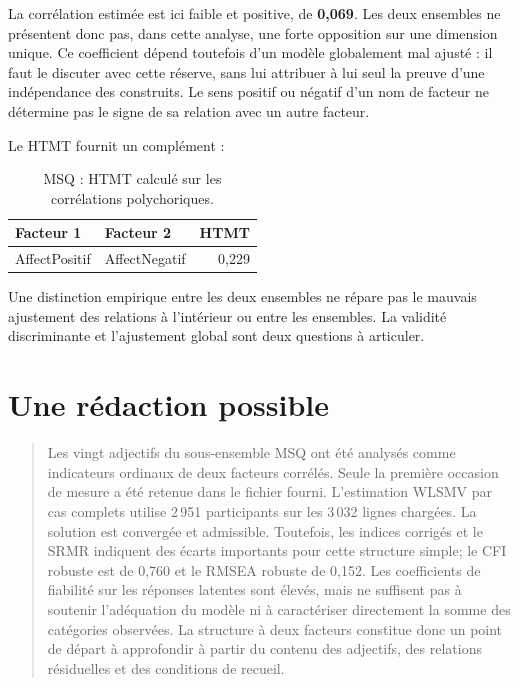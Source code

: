 \documentclass[
  french,
  11pt,
  a4paper,
  DIV=11,
  numbers=noendperiod]{scrreprt}
\begin{document}
La corrélation estimée est ici faible et positive, de \textbf{0,069}.
Les deux ensembles ne présentent donc pas, dans cette analyse, une forte
opposition sur une dimension unique. Ce coefficient dépend toutefois
d'un modèle globalement mal ajusté : il faut le discuter avec cette
réserve, sans lui attribuer à lui seul la preuve d'une indépendance des
construits. Le sens positif ou négatif d'un nom de facteur ne détermine
pas le signe de sa relation avec un autre facteur.

Le HTMT fournit un complément :


{

\begin{longtable}[]{@{}llr@{}}

\caption{\label{tbl-msq-htmt}MSQ : HTMT calculé sur les corrélations
polychoriques.}

\tabularnewline

\toprule\noalign{}
Facteur 1 & Facteur 2 & HTMT \\
\midrule\noalign{}
\endhead
\bottomrule\noalign{}
\endlastfoot
AffectPositif & AffectNegatif & 0,229 \\

\end{longtable}

}

Une distinction empirique entre les deux ensembles ne répare pas le
mauvais ajustement des relations à l'intérieur ou entre les ensembles.
La validité discriminante et l'ajustement global sont deux questions à
articuler.

\section{Une rédaction possible}\label{une-ruxe9daction-possible}

\begin{quote}
Les vingt adjectifs du sous-ensemble MSQ ont été analysés comme
indicateurs ordinaux de deux facteurs corrélés. Seule la première
occasion de mesure a été retenue dans le fichier fourni. L'estimation
WLSMV par cas complets utilise 2\,951 participants sur les 3\,032 lignes
chargées. La solution est convergée et admissible. Toutefois, les
indices corrigés et le SRMR indiquent des écarts importants pour cette
structure simple; le CFI robuste est de 0,760 et le RMSEA robuste de
0,152. Les coefficients de fiabilité sur les réponses latentes sont
élevés, mais ne suffisent pas à soutenir l'adéquation du modèle ni à
caractériser directement la somme des catégories observées. La structure
à deux facteurs constitue donc un point de départ à approfondir à partir
du contenu des adjectifs, des relations résiduelles et des conditions de
recueil.
\end{quote}
\end{document}

